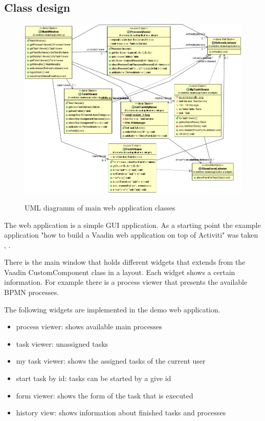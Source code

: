 \documentclass[paper=a4,twoside=false,BCOR=0mm,DIV=calc,fontsize=12pt]{scrartcl}
\begin{document}
\subsection{Class design}
\begin{figure}
    \begin{center}
      \includegraphics[width=1\textwidth]{./img/uml_webapp_model.png}\\
    \end{center}
  \caption{UML diagramm of main web application classes}
  \label{webapplicationclassuml}
\end{figure} 

The web application is a simple GUI application. As a starting point the example application "how to build a Vaadin web application on top of Activiti" was taken \cite{Vaadinactivitwebapp}, \cite{Vaadinactivitwebapp2}.

There is the main window that holds different widgets that extends from the Vaadin CustomComponent class in a layout. Each widget shows a certain
information. For example there is a process viewer that presents the available BPMN processes. 

The following widgets are implemented in the demo web application.

\begin{itemize}
 \item process viewer: shows available main processes
 \item task viewer: unassigned tasks
 \item my task viewer: shows the assigned tasks of the current user
 \item start task by id: tasks can be started by a give id
 \item form viewer: shows the form of the task that is executed
 \item history view: shows information about finished tasks and processes
\end{itemize}
\end{document}
